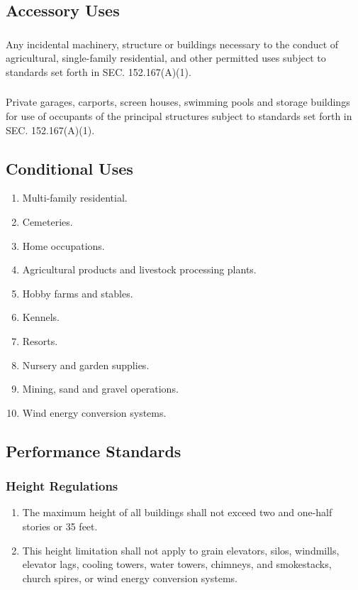 \subsection{Accessory Uses}
\subsubsection{}
Any incidental machinery, structure or buildings necessary to the conduct of agricultural, single-family residential, and other permitted uses subject to standards set forth in SEC. 152.167(A)(1).
\subsubsection{}
Private garages, carports, screen houses, swimming pools and storage buildings for use of occupants of the principal structures subject to standards set forth in SEC. 152.167(A)(1).
\subsection{Conditional Uses}
\begin{enumerate}[{\indent}1)]
    \item Multi-family residential.
    \item Cemeteries.
    \item Home occupations.
    \item Agricultural products and livestock processing plants.
    \item Hobby farms and stables.
    \item Kennels.
    \item Resorts.
    \item Nursery and garden supplies.
    \item Mining, sand and gravel operations.
    \item Wind energy conversion systems.
\end{enumerate}
\subsection{Performance Standards}
\subsubsection{Height Regulations}
\begin{enumerate}[{\indent}a)]
    \item The maximum height of all buildings shall not exceed two and one-half stories or 35 feet.
    \item This height limitation shall not apply to grain elevators, silos, windmills, elevator lags, cooling towers, water towers, chimneys, and smokestacks, church spires, or wind energy conversion systems.
\end{enumerate}
